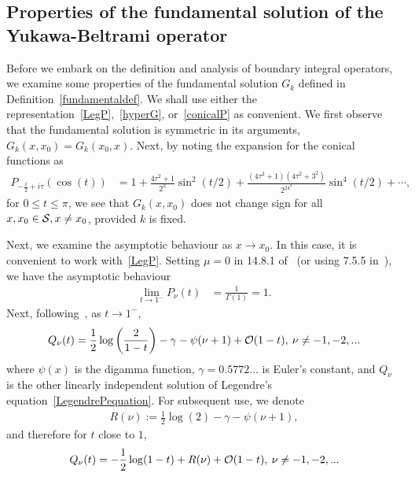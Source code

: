 \subsection{Properties of the fundamental solution of the
Yukawa-Beltrami operator}
Before we embark on the definition and analysis of boundary integral
operators, we examine some properties of the fundamental solution $G_k$
defined in Definition~\ref{fundamentaldef}. We shall use either the
representation~\eqref{LegP},~\eqref{hyperG}, or~\eqref{conicalP} as
convenient.  We first observe that the fundamental solution is symmetric
in its arguments, $G_k(x,x_{0}) = G_k(x_{0},x)$. Next, by noting the
expansion for the conical functions as~\cite{lebedev}
\begin{align*}
  P_{-\frac{1}{2}+i \tau} (\cos(t)) &= 1+
    \frac{4\tau^2+1}{2^2}\sin^2(t/2) + 
      \frac{(4\tau^2+1)(4\tau^2+3^2)}{2^24^2}\sin^4(t/2) + 
    \cdots,
\end{align*}
for $0\leq t\leq \pi$, we see that $G_k(x,x_0)$ does not change sign for
  all $x,x_{0} \in \S, x \neq x_{0}$, provided $k$ is fixed.

Next, we examine the asymptotic behaviour as $x\rightarrow x_0$. In this
case, it is convenient to work with~\eqref{LegP}. Setting $\mu=0$ in
14.8.1 of~\cite{fatAbramowitz} (or using 7.5.5 in~\cite{lebedev}), we
have the asymptotic behaviour
\begin{align} 
  \label{Pasymptotics}
  \lim_{t\rightarrow 1^- } P_\nu(t)&= \frac{1}{\Gamma(1)}=1.
\end{align}
Next, following~\cite{fatAbramowitz}, as $t\rightarrow 1^{-}$,
\begin{align*}
  Q_{\nu}(t)=\frac{1}{2}\log\left(\frac{2}{1-t}\right)-\gamma
  -\psi(\nu+1)+\bigO(1-t),\: \nu \neq -1,-2,...
\end{align*} 
where $\psi(x)$ is the digamma function, $\gamma=0.5772\ldots$ is
Euler's constant, and $Q_{\nu}$ is the other linearly independent
solution of Legendre's equation~\eqref{LegendrePequation}.  For
subsequent use, we denote 
\begin{align*}
  R(\nu):= \frac{1}{2}\log(2) -\gamma -\psi(\nu+1), 
\end{align*}
and therefore for $t$ close to $1$,
\begin{equation}
  \label{Qasymptotics}
  Q_{\nu}(t)=-\frac{1}{2}\log(1-t) + 
  R(\nu) + \bigO(1-t),\: \nu \neq -1,-2,... 
\end{equation}

